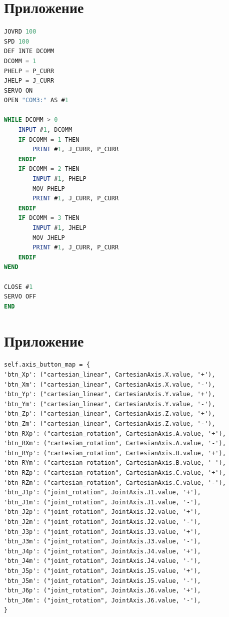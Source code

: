 \documentclass[a4paper,14pt]{extarticle}
\begin{document}
\section{Приложение}
\begin{lstlisting}[language=Basic, label=lst:finalmelfa, caption={Программа на роботе-манипуляторе для выполнения команд, присылаемых клиентом.}]
JOVRD 100
SPD 100
DEF INTE DCOMM
DCOMM = 1
PHELP = P_CURR
JHELP = J_CURR
SERVO ON
OPEN "COM3:" AS #1

WHILE DCOMM > 0
    INPUT #1, DCOMM
    IF DCOMM = 1 THEN
        PRINT #1, J_CURR, P_CURR
    ENDIF
    IF DCOMM = 2 THEN
        INPUT #1, PHELP
        MOV PHELP
        PRINT #1, J_CURR, P_CURR
    ENDIF
    IF DCOMM = 3 THEN
        INPUT #1, JHELP
        MOV JHELP
        PRINT #1, J_CURR, P_CURR
    ENDIF
WEND

CLOSE #1
SERVO OFF
END
\end{lstlisting}


\section{Приложение}
\begin{lstlisting}[label=mvinf, caption={Карта кнопок окна программы, которым соответствуют кортежи move\_info, описывающие соответствующую кнопку.}]
self.axis_button_map = {
'btn_Xp': ("cartesian_linear", CartesianAxis.X.value, '+'),
'btn_Xm': ("cartesian_linear", CartesianAxis.X.value, '-'),
'btn_Yp': ("cartesian_linear", CartesianAxis.Y.value, '+'),
'btn_Ym': ("cartesian_linear", CartesianAxis.Y.value, '-'),
'btn_Zp': ("cartesian_linear", CartesianAxis.Z.value, '+'),
'btn_Zm': ("cartesian_linear", CartesianAxis.Z.value, '-'),
'btn_RXp': ("cartesian_rotation", CartesianAxis.A.value, '+'),
'btn_RXm': ("cartesian_rotation", CartesianAxis.A.value, '-'),
'btn_RYp': ("cartesian_rotation", CartesianAxis.B.value, '+'),
'btn_RYm': ("cartesian_rotation", CartesianAxis.B.value, '-'),
'btn_RZp': ("cartesian_rotation", CartesianAxis.C.value, '+'),
'btn_RZm': ("cartesian_rotation", CartesianAxis.C.value, '-'),
'btn_J1p': ("joint_rotation", JointAxis.J1.value, '+'),
'btn_J1m': ("joint_rotation", JointAxis.J1.value, '-'),
'btn_J2p': ("joint_rotation", JointAxis.J2.value, '+'),
'btn_J2m': ("joint_rotation", JointAxis.J2.value, '-'),
'btn_J3p': ("joint_rotation", JointAxis.J3.value, '+'),
'btn_J3m': ("joint_rotation", JointAxis.J3.value, '-'),
'btn_J4p': ("joint_rotation", JointAxis.J4.value, '+'),
'btn_J4m': ("joint_rotation", JointAxis.J4.value, '-'),
'btn_J5p': ("joint_rotation", JointAxis.J5.value, '+'),
'btn_J5m': ("joint_rotation", JointAxis.J5.value, '-'),
'btn_J6p': ("joint_rotation", JointAxis.J6.value, '+'),
'btn_J6m': ("joint_rotation", JointAxis.J6.value, '-'),
} 
\end{lstlisting}
\end{document}
